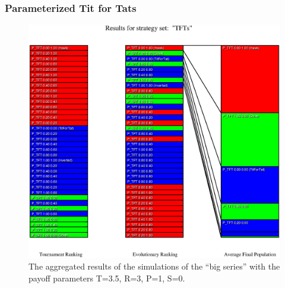 \newpage
\subsubsection{Parameterized Tit for Tats}
\begin{small}

\end{small}

\begin{figure}
\begin{center}
\includegraphics[width=20cm]{tables/TFTs_P3.5.eps}
\caption{\label{TFTs_P35} The aggregated results of the
simulations of the ``big series'' with the payoff parameters T=3.5, R=3, P=1,
S=0.}
\end{center}
\end{figure}

